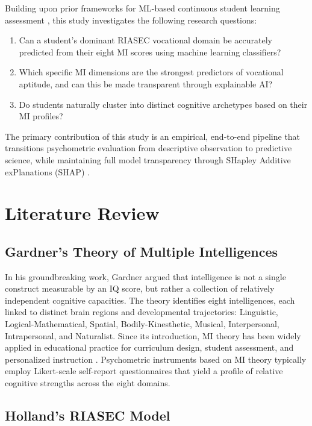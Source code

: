 \documentclass[12pt, a4paper]{article}
\begin{document}
Building upon prior frameworks for ML-based continuous student learning assessment \cite{nanade2021predictive, nanade2020model}, this study investigates the following research questions:
\begin{enumerate}
    \item Can a student's dominant RIASEC vocational domain be accurately predicted from their eight MI scores using machine learning classifiers?
    \item Which specific MI dimensions are the strongest predictors of vocational aptitude, and can this be made transparent through explainable AI?
    \item Do students naturally cluster into distinct cognitive archetypes based on their MI profiles?
\end{enumerate}

The primary contribution of this study is an empirical, end-to-end pipeline that transitions psychometric evaluation from descriptive observation to predictive science, while maintaining full model transparency through SHapley Additive exPlanations (SHAP) \cite{lundberg2017unified}.

\section{Literature Review}

\subsection{Gardner's Theory of Multiple Intelligences}

In his groundbreaking work, Gardner \citeyear{gardner2011frames} argued that intelligence is not a single construct measurable by an IQ score, but rather a collection of relatively independent cognitive capacities. The theory identifies eight intelligences, each linked to distinct brain regions and developmental trajectories: Linguistic, Logical-Mathematical, Spatial, Bodily-Kinesthetic, Musical, Interpersonal, Intrapersonal, and Naturalist. Since its introduction, MI theory has been widely applied in educational practice for curriculum design, student assessment, and personalized instruction \cite{shearer2018multiple}. Psychometric instruments based on MI theory typically employ Likert-scale self-report questionnaires that yield a profile of relative cognitive strengths across the eight domains.

\subsection{Holland's RIASEC Model}
\end{document}

